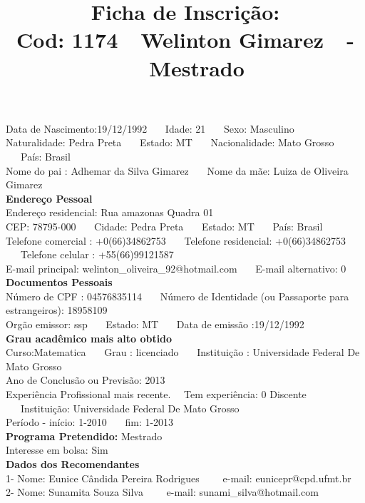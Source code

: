 \documentclass[11pt]{article}
\title{\vspace*{-4cm} Ficha de Inscrição: \\Cod: 1174\ \ Welinton Gimarez\ \ - \ \ Mestrado 
 }
\date{}
\begin{document}
\maketitle
\vspace*{-1.5cm}
\noindent Data de Nascimento:19/12/1992
\ \ \ Idade: 21   \ \ \ Sexo: Masculino
\\
Naturalidade: Pedra Preta  
\ \ \  Estado: MT
\ \ \  Nacionalidade: Mato Grosso
\ \ \ País: Brasil
\\        
Nome do pai : Adhemar da Silva Gimarez
\ \ \ Nome da mãe: Luiza de Oliveira Gimarez          
\\[0.2cm]                     
\textbf{Endereço Pessoal} 
\\ 
\noindent Endereço residencial: Rua amazonas Quadra 01
\\
        CEP: 78795-000 
\ \ \ Cidade: Pedra Preta 
\ \ \ Estado: MT 
\ \ \ País: Brasil
\\		
		Telefone comercial : +0(66)34862753
\ \ \ Telefone residencial: +0(66)34862753
\ \ \ Telefone celular : +55(66)99121587
\\
E-mail principal: welinton\_oliveira\_92@hotmail.com
\ \ \ E-mail alternativo: 0 
\\[0.2cm] 
\textbf{Documentos Pessoais}
\\
\noindent Número de CPF : 04576835114
\ \ \ Número de Identidade (ou Passaporte para estrangeiros): 18958109
\\
Orgão emissor: ssp
\ \ \ Estado: MT
\ \ \ Data de emissão :19/12/1992
\\[0.3cm]
\textbf{Grau acadêmico mais alto obtido}
\\	
Curso:Matematica
\ \ \ Grau : licenciado
\ \ \ Instituição : Universidade Federal De Mato Grosso
\\			
Ano de Conclusão ou Previsão: 2013
\\ 
Experiência Profissional mais recente. \ \  
Tem experiência: 0 Discente  
\ \ \ Instituição: Universidade Federal De Mato Grosso
\\  
Período - início: 1-2010
\ \ \ fim: 1-2013
\\[0.2cm] 
\textbf{Programa Pretendido:} Mestrado\\
Interesse em bolsa: Sim
\\[0.3cm]		
\textbf{Dados dos Recomendantes} 
\\
1- Nome: Eunice Cândida Pereira Rodrigues
\ \ \ \  e-mail: eunicepr@cpd.ufmt.br 
\\
2- Nome: Sunamita Souza Silva
\ \ \ \ e-mail: sunami\_silva@hotmail.com
\end{document}
